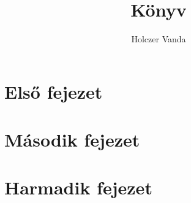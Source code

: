 \documentclass{book}
\begin{document}
    \frontmatter
        \title{Könyv}
        \author{Holczer Vanda}
        \maketitle
    
        \tableofcontents
    
    \mainmatter
        \chapter{Első fejezet}
            \cite{abrharber03}
            \lipsum[2-7]
            \cite{knuth84}
        \chapter{Második fejezet}
            \lipsum[3-5]
        \chapter{Harmadik fejezet}
            \lipsum[1]
            \cite{g4gbin}
            \lipsum[8]
            
    \backmatter
        
        
    
\end{document}
